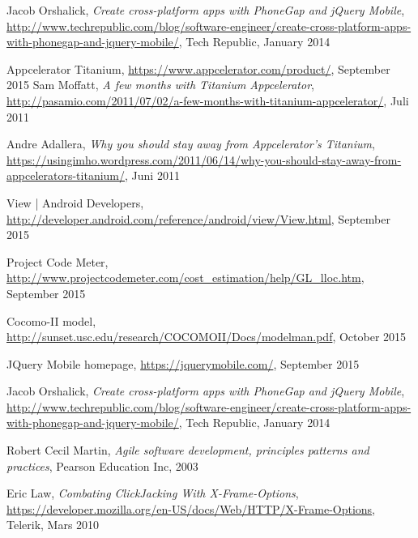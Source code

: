 \begin{thebibliography}{9}
Jacob Orshalick,
\emph{Create cross-platform apps with PhoneGap and jQuery Mobile},
\url{http://www.techrepublic.com/blog/software-engineer/create-cross-platform-apps-with-phonegap-and-jquery-mobile/},
	Tech Republic,
	January 2014

	Appcelerator Titanium,
	\url{https://www.appcelerator.com/product/},
	September 2015
	Sam Moffatt,
	\emph{A few months with Titanium Appcelerator},
	\url{http://pasamio.com/2011/07/02/a-few-months-with-titanium-appcelerator/},
	Juli 2011

	Andre Adallera,
\emph{Why you should stay away from Appcelerator’s Titanium},
\url{https://usingimho.wordpress.com/2011/06/14/why-you-should-stay-away-from-appcelerators-titanium/},
	Juni 2011

	View | Android Developers,
	\url{http://developer.android.com/reference/android/view/View.html},
	September 2015	
	
	Project Code Meter, 
	\url{http://www.projectcodemeter.com/cost_estimation/help/GL_lloc.htm},
	September 2015

	Cocomo-II model,
	\url{http://sunset.usc.edu/research/COCOMOII/Docs/modelman.pdf},
	October 2015

	JQuery Mobile homepage,
	\url{https://jquerymobile.com/},
	September 2015


Jacob Orshalick,
\emph{Create cross-platform apps with PhoneGap and jQuery Mobile},
\url{http://www.techrepublic.com/blog/software-engineer/create-cross-platform-apps-with-phonegap-and-jquery-mobile/},
	Tech Republic,
	January 2014

	Robert Cecil Martin,
	\emph{Agile software development, principles patterns and practices},
	Pearson Education Inc,
	2003	

	Eric Law,
	\emph{Combating ClickJacking With X-Frame-Options},
	\url{https://developer.mozilla.org/en-US/docs/Web/HTTP/X-Frame-Options},
	Telerik,
	Mars 2010
\end{thebibliography}